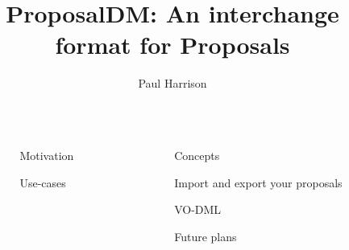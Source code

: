 \documentclass[final]{beamer}
\title{ProposalDM: An interchange format for Proposals}
\author{Paul Harrison}
\institute[shortinst]{JBCA, The University of Manchester, UK}
\newlength{\sepwidth}
\newlength{\colwidth}
\newcommand{\separatorcolumn}{\begin{column}{\sepwidth}\end{column}}
\begin{document}
    \begin{frame}[t]
        \begin{columns}[t]
            \separatorcolumn

            \begin{column}{\colwidth}

                \begin{block}{Motivation}



                \end{block}

                \begin{block}{Use-cases}



                \end{block}

            \end{column}

            \separatorcolumn

            \begin{column}{\colwidth}

                \begin{block}{Concepts}

                \end{block}

                \begin{alertblock}{Import and export your proposals}


                \end{alertblock}

                \begin{block}{VO-DML}

                \end{block}

                \begin{exampleblock}{Future plans}

                \end{exampleblock}


\end{column}
\end{columns}
\end{frame}
\end{document}
